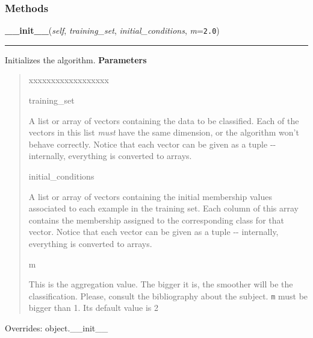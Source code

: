   \subsubsection{Methods}

    \vspace{0.5ex}

\hspace{.8\funcindent}\begin{boxedminipage}{\funcwidth}

    \raggedright \textbf{\_\_init\_\_}(\textit{self}, \textit{training\_set}, \textit{initial\_conditions}, \textit{m}={\tt 2.0})

    \vspace{-1.5ex}

    \rule{\textwidth}{0.5\fboxrule}
\setlength{\parskip}{2ex}

Initializes the algorithm.
\setlength{\parskip}{1ex}
      \textbf{Parameters}
      \vspace{-1ex}

      \begin{quote}
        \begin{Ventry}{xxxxxxxxxxxxxxxxxx}

          \item[training\_set]


A list or array of vectors containing the data to be classified.
Each of the vectors in this list \emph{must} have the same dimension, or
the algorithm won't behave correctly. Notice that each vector can be
given as a tuple -{}- internally, everything is converted to arrays.
          \item[initial\_conditions]


A list or array of vectors containing the initial membership values
associated to each example in the training set. Each column of this
array contains the membership assigned to the corresponding class
for that vector. Notice that each vector can be given as a tuple -{}-
internally, everything is converted to arrays.
          \item[m]


This is the aggregation value. The bigger it is, the smoother will
be the classification. Please, consult the bibliography about the
subject. \texttt{m} must be bigger than 1. Its default value is 2
        \end{Ventry}

      \end{quote}

      Overrides: object.\_\_init\_\_

    \end{boxedminipage}

